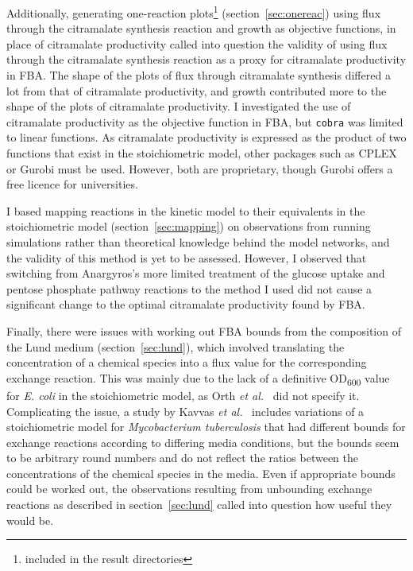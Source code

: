 \documentclass[parskip=full, numbers=noenddot]{scrreprt}
\begin{document}
Additionally, generating one-reaction plots\footnote{included in the result directories} (section~\ref{sec:onereac}) using flux through the citramalate synthesis reaction and growth as objective functions, in place of citramalate productivity called into question the validity of using flux through the citramalate synthesis reaction as a proxy for citramalate productivity in FBA. The shape of the plots of flux through citramalate synthesis differed a lot from that of citramalate productivity, and growth contributed more to the shape of the plots of citramalate productivity. I investigated the use of citramalate productivity as the objective function in FBA, but \texttt{cobra} was limited to linear functions. As citramalate productivity is expressed as the product of two functions that exist in the stoichiometric model, other packages such as CPLEX or Gurobi must be used. However, both are proprietary, though Gurobi offers a free licence for universities.

I based mapping reactions in the kinetic model to their equivalents in the stoichiometric model (section~\ref{sec:mapping}) on observations from running simulations rather than theoretical knowledge behind the model networks, and the validity of this method is yet to be assessed. However, I observed that switching from Anargyros's more limited treatment of the glucose uptake and pentose phosphate pathway reactions to the method I used did not cause a significant change to the optimal citramalate productivity found by FBA.

Finally, there were issues with working out FBA bounds from the composition of the Lund medium (section~\ref{sec:lund}), which involved translating the concentration of a chemical species into a flux value for the corresponding exchange reaction. This was mainly due to the lack of a definitive OD\textsubscript{600} value for \emph{E. coli} in the stoichiometric model, as Orth \emph{et al.}~\cite{orth_comprehensive_2011} did not specify it. Complicating the issue, a study by Kavvas \emph{et al.}~\cite{kavvas_updated_2018} includes variations of a stoichiometric model for \emph{Mycobacterium tuberculosis} that had different bounds for exchange reactions according to differing media conditions, but the bounds seem to be arbitrary round numbers and do not reflect the ratios between the concentrations of the chemical species in the media. Even if appropriate bounds could be worked out, the observations resulting from unbounding exchange reactions as described in section~\ref{sec:lund} called into question how useful they would be.
\end{document}
